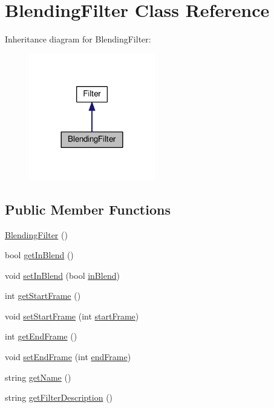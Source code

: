 \hypertarget{classModel_1_1BlendingFilter}{}\section{Blending\+Filter Class Reference}
\label{classModel_1_1BlendingFilter}


Inheritance diagram for Blending\+Filter\+:
\nopagebreak
\begin{figure}[H]
\begin{center}
\leavevmode
\includegraphics[width=156pt]{classModel_1_1BlendingFilter__inherit__graph}
\end{center}
\end{figure}
\subsection*{Public Member Functions}
\begin{DoxyCompactItemize}
\item 
\hyperlink{classModel_1_1BlendingFilter_aef4d8116cdf1f472bfc3f294a324a68d}{Blending\+Filter} ()
\item 
bool \hyperlink{classModel_1_1BlendingFilter_a323aa2fded0187976205e9bd41455108}{get\+In\+Blend} ()
\item 
void \hyperlink{classModel_1_1BlendingFilter_a4b3c5d143c333646fc19059b52d91f98}{set\+In\+Blend} (bool \hyperlink{classModel_1_1BlendingFilter_a5236a1acd21870beccb3622a0d868f64}{in\+Blend})
\item 
int \hyperlink{classModel_1_1BlendingFilter_ab75960aceca9106a2d1e4ac528e5c00f}{get\+Start\+Frame} ()
\item 
void \hyperlink{classModel_1_1BlendingFilter_aef2a28543fc8ddf9225491e032590c9c}{set\+Start\+Frame} (int \hyperlink{classModel_1_1BlendingFilter_a2c832c53905dc1fcfff946674d89f01d}{start\+Frame})
\item 
int \hyperlink{classModel_1_1BlendingFilter_a46a1b77243525a05a4c5594b00c7be28}{get\+End\+Frame} ()
\item 
void \hyperlink{classModel_1_1BlendingFilter_a87b980b1874e8518ddb597d74bd3c832}{set\+End\+Frame} (int \hyperlink{classModel_1_1BlendingFilter_ae86f112663a85130f9a8de28ca0070cb}{end\+Frame})
\item 
string \hyperlink{classModel_1_1BlendingFilter_a11335e13e50af74108bf926dc1340b4b}{get\+Name} ()
\item 
string \hyperlink{classModel_1_1BlendingFilter_a62b7b60e24f92234393b840b35808e06}{get\+Filter\+Description} ()
\end{DoxyCompactItemize}
